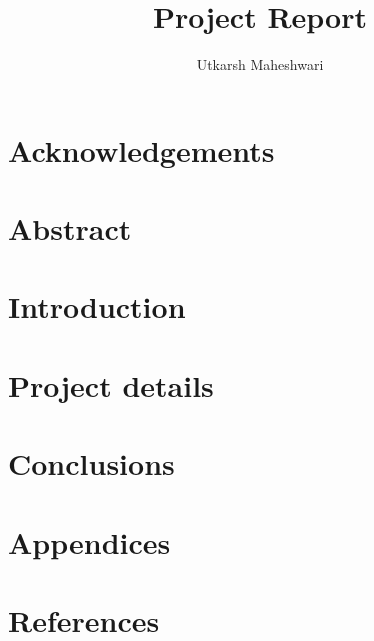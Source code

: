 \documentclass[12pt, a4paper, oneside, titlepage]{report}
\title{Project Report}
\author{Utkarsh Maheshwari}
\begin{document}
\makecover

\maketitle

\chapter{Acknowledgements}


\chapter{Abstract}


\tableofcontents

\chapter{Introduction}


\chapter{Project details}


\chapter{Conclusions}


\chapter{Appendices}


\chapter{References}


\printglossaries
\end{document}
